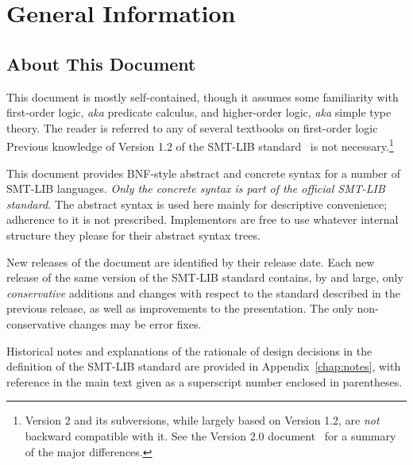 

\chapter{General Information}
\thispagestyle{empty}


\section{About This Document}

This document is mostly self-contained, though 
it assumes some familiarity with first-order logic, \emph{aka} predicate calculus,
and higher-order logic, \emph{aka} simple type theory.
The reader is referred to any of several textbooks 
on first-order logic~\cite{Gal-86,Fit-96,Hen-01,Men-09} 
%
Previous knowledge of Version 1.2 of the SMT-LIB standard~\cite{RanTin-RR-06}
is not necessary.\footnote{%
Version 2 and its subversions,
while largely based on Version 1.2, 
are \emph{not} backward compatible with it.
See the Version 2.0 document~\cite{BarST-RR-10} for a summary of the major differences.
}

This document provides BNF-style abstract and concrete syntax 
for a number of SMT-LIB languages.
\emph{Only the concrete syntax is part of the official SMT-LIB standard.}
The abstract syntax is used here mainly for descriptive convenience;
adherence to it is not prescribed.
Implementors are free to use whatever internal structure 
they please for their abstract syntax trees.
\medskip

New releases of the document are identified by their release date.
Each new release of the same version of the SMT-LIB standard 
contains, by and large, only \emph{conservative} additions and 
changes with respect to the standard described in the previous release,
as well as improvements to the presentation.
The only non-conservative changes may be error fixes.

Historical notes and 
explanations of the rationale of design decisions
in the definition of the SMT-LIB standard are provided 
in Appendix~\ref{chap:notes}, 
with reference in the main text given as a superscript number 
enclosed in parentheses.

